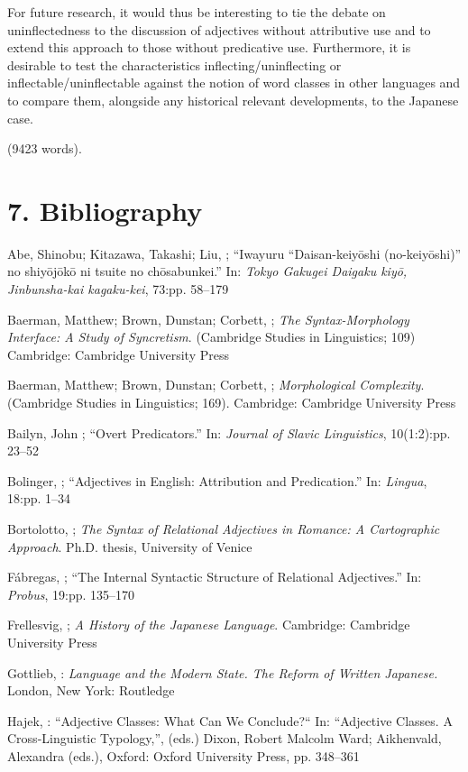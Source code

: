 \documentclass[output=paper]{langscibook}
\begin{document}
For future research, it would thus be interesting to tie the debate on uninflectedness to the discussion of adjectives without attributive use and to extend this approach to those without predicative use. Furthermore, it is desirable to test the characteristics inflecting/uninflecting or inflectable/uninflectable against the notion of word classes in other languages and to compare them, alongside any historical relevant developments, to the Japanese case.

(9423 words).

\section{7. Bibliography}

Abe, Shinobu; Kitazawa, Takashi; Liu, \citet{Kenan2022}; “Iwayuru “Daisan-keiyōshi (no-keiyōshi)” no shiyōjōkō ni tsuite no chōsabunkei.” In: \textit{Tokyo Gakugei Daigaku kiyō, Jinbunsha-kai kagaku-kei}, 73:pp. 58–179 

Baerman, Matthew; Brown, Dunstan; Corbett, \citet{Greville2005}; \textit{The Syntax-Morphology Interface: A Study of Syncretism}. (Cambridge Studies in Linguistics; 109) Cambridge: Cambridge University Press

Baerman, Matthew; Brown, Dunstan; Corbett, \citet{Greville2017}; \textit{Morphological Complexity}. (Cambridge Studies in Linguistics; 169). Cambridge: Cambridge University Press

Bailyn, John \citet{Frederick2002}; “Overt Predicators.” In: \textit{Journal of Slavic Linguistics}, 10(1:2):pp. 23–52 

Bolinger, \citet{Dwight1967}; “Adjectives in English: Attribution and Predication.” In: \textit{Lingua}, 18:pp. 1–34 

Bortolotto, \citet{Laura2016}; \textit{The Syntax of Relational Adjectives in Romance: A Cartographic Approach}. Ph.D. thesis, University of Venice

Fábregas, \citet{Antonio2007}; “The Internal Syntactic Structure of Relational Adjectives.” In: \textit{Probus}, 19:pp. 135–170 

Frellesvig, \citet{Bjarke2010}; \textit{A History of the Japanese Language}. Cambridge: Cambridge University Press 

Gottlieb, \citet{Nanette1991}: \textit{Language and the Modern State. The Reform of Written Japanese.} London, New York: Routledge

Hajek, \citet{John2004}: “Adjective Classes: What Can We Conclude?“ In: “Adjective Classes. A Cross-Linguistic Typology,”, (eds.) Dixon, Robert Malcolm Ward; Aikhenvald, Alexandra (eds.), Oxford: Oxford University Press, pp. 348–361
\end{document}
